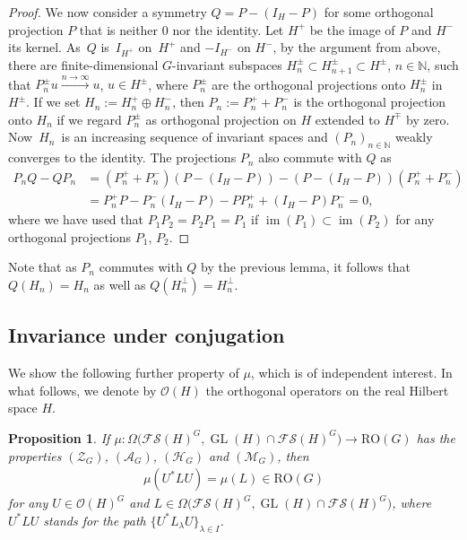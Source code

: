 \documentclass[pdftex]{sigma}
\numberwithin{equation}{section}
\newtheorem{Proposition}[Theorem]{Proposition}
\theoremstyle{definition}
\DeclareMathOperator{\im}{im}
\DeclareMathOperator{\GL}{GL}
\begin{document}
\begin{proof}
We now consider a symmetry $Q=P-(I_H-P)$ for some orthogonal projection $P$ that is neither $0$ nor the identity. Let $H^+$ be the image of $P$ and $H^-$ its kernel. As~$Q$ is~$I_{H^+}$ on~$H^+$ and $-I_{H^-}$ on $H^-$, by the argument from above, there are finite-dimensional $G$-invariant subspaces $H^\pm_n\subset H^\pm_{n+1}\subset H^\pm$, $n\in\mathbb{N}$, such that $P^\pm_nu\xrightarrow{n\rightarrow\infty} u$, $u\in H^\pm$, where $P^\pm_n$ are the orthogonal projections onto $H^\pm_n$ in $H^\pm$. If we set $H_n:=H^+_n\oplus H^-_n$, then $P_n:=P^+_n+P^-_n$ is the orthogonal projection onto $H_n$ if we regard $P^\pm_n$ as orthogonal projection on $H$ extended to $H^\mp$ by zero. Now~$H_n$~is an increasing sequence of invariant spaces and $(P_n)_{n\in\mathbb{N}}$ weakly converges to the identity. The projections $P_n$ also commute with $Q$ as
\begin{align*}
P_nQ-QP_n&=(P^+_n+P^-_n)(P-(I_H-P))-(P-(I_H-P))(P^+_n+P^-_n)\\
&=P^+_nP-P^-_n(I_H-P)-PP^+_n+(I_H-P)P^-_n=0,
\end{align*}
where we have used that $P_1P_2=P_2P_1=P_1$ if $\im(P_1)\subset\im(P_2)$ for any orthogonal projections $P_1$, $P_2$.
\end{proof}

Note that as $P_n$ commutes with $Q$ by the previous lemma, it follows that $Q(H_n)=H_n$ as well as $Q(H^\perp_n)=H^\perp_n$.

\subsection{Invariance under conjugation}\label{sect-OG}
We show the following further property of $\mu$, which is of independent interest. In what follows, we denote by $\mathcal{O}(H)$ the orthogonal operators on the real Hilbert space $H$.

\begin{Proposition}\label{prop-OG}
If $\mu \colon \Omega\bigl(\mathcal{FS}(H)^G,\GL(H)\cap\mathcal{FS}(H)^G\bigr)\rightarrow \mathrm{RO}(G)$ has the properties $(\mathcal{Z}_G)$, $(\mathcal{A}_G)$, $(\mathcal{H}_G)$ and $(\mathcal{M}_G)$, then
\begin{align}\label{OG}
\mu(U^\ast LU)=\mu(L)\in \mathrm{RO}(G)
\end{align}
for any $U\in\mathcal{O}(H)^G$ and $L\in\Omega\bigl(\mathcal{FS}(H)^G,\GL(H)\cap\mathcal{FS}(H)^G\bigr)$, where $U^\ast LU$ stands for the path $\{U^\ast L_\lambda U\}_{\lambda\in I}$.
\end{Proposition}
\end{document}
